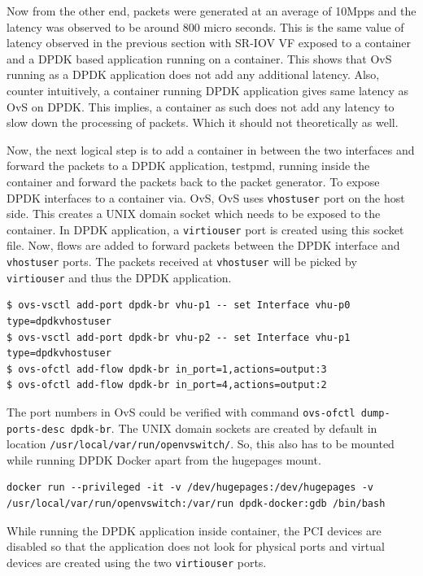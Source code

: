 \documentclass[english, 12pt, a4paper, elec, utf8, a-1b, online]{aaltothesis}
\begin{document}
Now from the other end, packets were generated at an average of 10Mpps and the latency was observed to be around 800 micro seconds. This is the same value of latency observed in the previous section with SR-IOV VF exposed to a container and a DPDK based application running on a container. This shows that OvS running as a DPDK application does not add any additional latency. Also, counter intuitively, a container running DPDK application gives same latency as OvS on DPDK. This implies, a container as such does not add any latency to slow down the processing of packets. Which it should not theoretically as well.

Now, the next logical step is to add a container in between the two interfaces and forward the packets to a DPDK application, testpmd, running inside the container and forward the packets back to the packet generator. To expose DPDK interfaces to a container via. OvS, OvS uses \lstinline{vhostuser} port on the host side. This creates a UNIX domain socket which needs to be exposed to the container. In DPDK application, a \lstinline{virtiouser} port is created using this socket file. Now, flows are added to forward packets between the DPDK interface and \lstinline{vhostuser} ports. The packets received at \lstinline{vhostuser} will be picked by \lstinline{virtiouser} and thus the DPDK application.

\begin{lstlisting}[basicstyle={\small\ttfamily}]
$ ovs-vsctl add-port dpdk-br vhu-p1 -- set Interface vhu-p0 type=dpdkvhostuser
$ ovs-vsctl add-port dpdk-br vhu-p2 -- set Interface vhu-p1 type=dpdkvhostuser
$ ovs-ofctl add-flow dpdk-br in_port=1,actions=output:3
$ ovs-ofctl add-flow dpdk-br in_port=4,actions=output:2
\end{lstlisting}

The port numbers in OvS could be verified with command \lstinline{ovs-ofctl dump-ports-desc dpdk-br}. The UNIX domain sockets are created by default in location \lstinline{/usr/local/var/run/openvswitch/}. So, this also has to be mounted while running DPDK Docker apart from the hugepages mount.

\begin{lstlisting}[basicstyle={\small\ttfamily}]
docker run --privileged -it -v /dev/hugepages:/dev/hugepages -v /usr/local/var/run/openvswitch:/var/run dpdk-docker:gdb /bin/bash
\end{lstlisting}

While running the DPDK application inside container, the PCI devices are disabled so that the application does not look for physical ports and virtual devices are created using the two \lstinline{virtiouser} ports.
\end{document}

